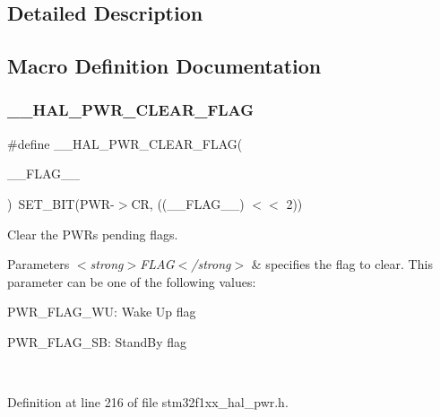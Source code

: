 \subsection{Detailed Description}


\subsection{Macro Definition Documentation}
\mbox{\label{group___p_w_r___exported___macros_ga96f24bf4b16c9f944cd829100bf746e5}} 
\subsubsection{\texorpdfstring{\+\_\+\+\_\+\+H\+A\+L\+\_\+\+P\+W\+R\+\_\+\+C\+L\+E\+A\+R\+\_\+\+F\+L\+AG}{\_\_HAL\_PWR\_CLEAR\_FLAG}}
{\footnotesize\ttfamily \#define \+\_\+\+\_\+\+H\+A\+L\+\_\+\+P\+W\+R\+\_\+\+C\+L\+E\+A\+R\+\_\+\+F\+L\+AG(\begin{DoxyParamCaption}\item[{}]{\+\_\+\+\_\+\+F\+L\+A\+G\+\_\+\+\_\+ }\end{DoxyParamCaption})~S\+E\+T\+\_\+\+B\+IT(P\+WR-\/$>$CR, ((\+\_\+\+\_\+\+F\+L\+A\+G\+\_\+\+\_\+) $<$$<$ 2))}



Clear the P\+WR\textquotesingle{}s pending flags. 


\begin{DoxyParams}{Parameters}
{\em $<$strong$>$\+F\+L\+A\+G$<$/strong$>$} & specifies the flag to clear. This parameter can be one of the following values\+: \begin{DoxyItemize}
\item P\+W\+R\+\_\+\+F\+L\+A\+G\+\_\+\+WU\+: Wake Up flag \item P\+W\+R\+\_\+\+F\+L\+A\+G\+\_\+\+SB\+: Stand\+By flag \end{DoxyItemize}
\\
\hline
\end{DoxyParams}


Definition at line 216 of file stm32f1xx\+\_\+hal\+\_\+pwr.\+h.

